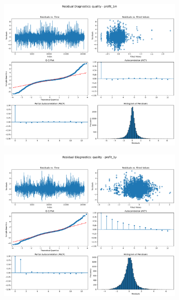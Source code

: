 \documentclass[11pt,english,a4paper,hidelinks]{book}
\begin{document}
\begin{figure}[H]
    \centering
    \begin{subfigure}[b]{0.32\textwidth}
        \centering
        \includegraphics[width=\textwidth]{images/code/models/linear_regression/third_model/USA/quality_profit_1m_residuals.png}
    \end{subfigure}
    \hfill
    \begin{subfigure}[b]{0.32\textwidth}
        \centering
        \includegraphics[width=\textwidth]{images/code/models/linear_regression/third_model/USA/quality_profit_1y_residuals.png}

\end{subfigure}
\end{figure}
\end{document}
